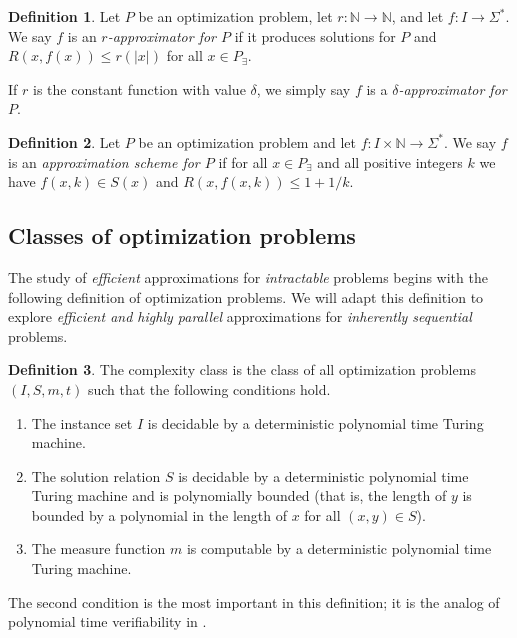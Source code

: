 \documentclass[]{article}
\theoremstyle{plain}
\theoremstyle{definition}
\newtheorem{definition}{Definition}
\begin{document}
\begin{definition}
  Let $P$ be an optimization problem, let $r\colon \mathbb{N}\to\mathbb{N}$, and let $f\colon I\to \Sigma^*$.
  We say $f$ is an \emph{$r$-approximator for $P$} if it produces solutions for $P$ and $R(x, f(x)) \leq r(|x|)$ for all $x\in P_\exists$.

  If $r$ is the constant function with value $\delta$, we simply say $f$ is a \emph{$\delta$-approximator for $P$}.
\end{definition}

\begin{definition}
  Let $P$ be an optimization problem and let $f\colon I\times\mathbb{N}\to\Sigma^*$.
  We say $f$ is an \emph{approximation scheme for $P$} if for all $x\in P_\exists$ and all positive integers $k$ we have $f(x, k)\in S(x)$ and $R(x, f(x, k)) \leq 1 + 1 / k$.
\end{definition}

\subsection{Classes of optimization problems}

The study of \emph{efficient} approximations for \emph{intractable} problems begins with the following definition of \NP{} optimization problems.
We will adapt this definition to explore \emph{efficient and highly parallel} approximations for \emph{inherently sequential} problems.

\begin{definition}\label{def:npo}
  The complexity class \NPO{} is the class of all optimization problems $(I, S, m, t)$ such that the following conditions hold.
  \begin{enumerate}
  \item The instance set $I$ is decidable by a deterministic polynomial time Turing machine.
  \item The solution relation $S$ is decidable by a deterministic polynomial time Turing machine and is polynomially bounded (that is, the length of $y$ is bounded by a polynomial in the length of $x$ for all $(x, y)\in S$).
  \item The measure function $m$ is computable by a deterministic polynomial time Turing machine.
  \end{enumerate}
\end{definition}

The second condition is the most important in this definition; it is the analog of polynomial time verifiability in \NP.
\end{document}
